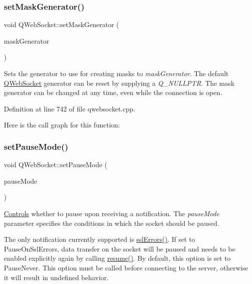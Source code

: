 \subsubsection{\texorpdfstring{set\+Mask\+Generator()}{setMaskGenerator()}}
{\footnotesize\ttfamily void Q\+Web\+Socket\+::set\+Mask\+Generator (\begin{DoxyParamCaption}\item[{const \mbox{\hyperlink{class_q_mask_generator}{Q\+Mask\+Generator}} $\ast$}]{mask\+Generator }\end{DoxyParamCaption})}

Sets the generator to use for creating masks to {\itshape mask\+Generator}. The default \mbox{\hyperlink{class_q_web_socket}{Q\+Web\+Socket}} generator can be reset by supplying a {\itshape Q\+\_\+\+N\+U\+L\+L\+P\+TR}. The mask generator can be changed at any time, even while the connection is open. 

Definition at line 742 of file qwebsocket.\+cpp.

Here is the call graph for this function\+:
\mbox{\label{class_q_web_socket_a7d6650c827cace4ccb27988894872bcc}} 
\subsubsection{\texorpdfstring{set\+Pause\+Mode()}{setPauseMode()}}
{\footnotesize\ttfamily void Q\+Web\+Socket\+::set\+Pause\+Mode (\begin{DoxyParamCaption}\item[{Q\+Abstract\+Socket\+::\+Pause\+Modes}]{pause\+Mode }\end{DoxyParamCaption})}

\mbox{\hyperlink{class_controls}{Controls}} whether to pause upon receiving a notification. The {\itshape pause\+Mode} parameter specifies the conditions in which the socket should be paused.

The only notification currently supported is \mbox{\hyperlink{class_q_web_socket_ae0d3eebd5b595e4e869d2ad6cef45ed7}{ssl\+Errors()}}. If set to Pause\+On\+Ssl\+Errors, data transfer on the socket will be paused and needs to be enabled explicitly again by calling \mbox{\hyperlink{class_q_web_socket_af21dbd52b116cc5dae811548000001ee}{resume()}}. By default, this option is set to Pause\+Never. This option must be called before connecting to the server, otherwise it will result in undefined behavior.

